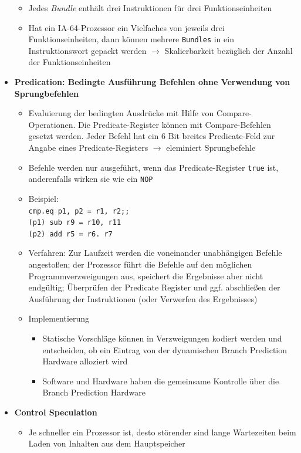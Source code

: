 \begin{itemize}
	\begin{itemize}
		\item Jedes \textit{Bundle} enthält drei Instruktionen für drei Funktionseinheiten
		\item Hat ein IA-64-Prozessor ein Vielfaches von jeweils drei Funktionseinheiten, dann können mehrere \texttt{Bundles} in ein Instruktionswort gepackt werden \(\rightarrow\) Skalierbarkeit bezüglich der Anzahl der Funktionseinheiten
	\end{itemize}
	\item \textbf{Predication: Bedingte Ausführung Befehlen ohne Verwendung von Sprungbefehlen}
	\begin{itemize}
		\item Evaluierung der bedingten Ausdrücke mit Hilfe von Compare-Operationen. Die Predicate-Register können mit Compare-Befehlen gesetzt werden. Jeder Befehl hat ein 6 Bit breites Predicate-Feld zur Angabe eines Predicate-Registers \(\rightarrow\) eleminiert Sprungbefehle
		\item Befehle werden nur ausgeführt, wenn das Predicate-Register \texttt{true} ist, anderenfalls wirken sie wie ein \texttt{NOP}
		\item Beispiel:\\ \texttt{cmp.eq p1, p2 = r1, r2;;\\(p1) sub r9 = r10, r11\\(p2) add r5 = r6. r7}
		\item Verfahren: Zur Laufzeit werden die voneinander unabhängigen Befehle angestoßen; der Prozessor führt die Befehle auf den möglichen Programmverzweigungen aus, speichert die Ergebnisse aber nicht endgültig; Überprüfen der Predicate Register und ggf. abschließen der Ausführung der Instruktionen (oder Verwerfen des Ergebnisses)
		\item Implementierung
		\begin{itemize}
			\item Statische Vorschläge können in Verzweigungen kodiert werden und entscheiden, ob ein Eintrag von der dynamischen Branch Prediction Hardware alloziert wird
			\item Software und Hardware haben die gemeinsame Kontrolle über die Branch Prediction Hardware
		\end{itemize}
	\end{itemize}
	\item \textbf{Control Speculation}
	\begin{itemize}
		\item Je schneller ein Prozessor ist, desto störender sind lange Wartezeiten beim Laden von Inhalten aus dem Hauptspeicher

\end{itemize}
\end{itemize}

